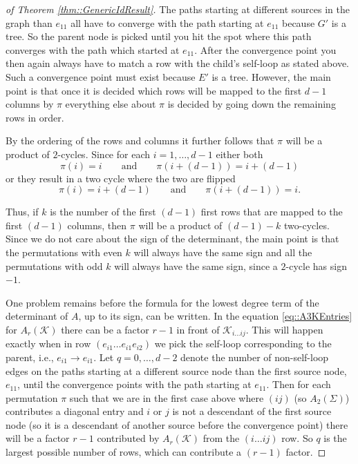 \documentclass{biometrika}
\begin{document}
\begin{proof}[of Theorem \ref{thm::GenericIdResult}]
The paths starting at different sources in the graph than $e_{11}$ all have to converge with the path starting at $e_{11}$ because $G'$ is a tree. So the parent node is picked until you hit the spot where this path converges with the path which started at $e_{11}$. After the convergence point you then again always have to match a row with the child's self-loop as stated above. Such a convergence point must exist because $E'$ is a tree. However, the main point is that once it is decided which rows will be mapped to the first $d-1$ columns by $\pi$ everything else about $\pi$ is decided by going down the remaining rows in order. 

By the ordering of the rows and columns it further follows that $\pi$ will be a product of $2$-cycles. Since for each $i = 1, \dots, d-1$ either both 
\begin{equation*}
    \pi(i) = i \qquad \mathrm{ and } \qquad \pi(i + (d-1)) = i + (d-1)
\end{equation*}
or they result in a two cycle where the two are flipped
\begin{equation*}
    \pi(i) = i + (d-1) \qquad \mathrm{ and } \qquad \pi(i + (d-1)) = i. 
\end{equation*}

Thus, if $k$ is the number of the first $(d-1)$ first rows that are mapped to the first $(d-1)$ columns, then $\pi$ will be a product of $(d-1) - k$ two-cycles. Since we do not care about the sign of the determinant, the main point is that the permutations with even $k$ will always have the same sign and all the permutations with odd $k$ will always have the same sign, since a $2$-cycle has sign $-1$. 

One problem remains before the formula for the lowest degree term of the determinant of $A$, up to its sign, can be written. In the equation \eqref{eq::A3KEntries} for $A_r(\mathcal{K} )$  there can be a factor $r-1$ in front of $\mathcal{K} _{i \dots ij}$. This will happen exactly when in row $(e_{i1} \dots e_{i1} e_{i2})$ we pick the self-loop corresponding to the parent, i.e., $e_{i1} \rightarrow e_{i1}$. 
Let $q = 0, \dots, d-2$ denote the number of non-self-loop edges on the paths starting at a different source node than the first source node, $e_{11}$, until the convergence points with the path starting at $e_{11}$.
Then for each permutation $\pi$ such that we are in the first case above where $(ij)$ (so $A_2(\Sigma)$) contributes a diagonal entry and $i$ or $j$ is not a descendant of the first source node (so it is a descendant of another source before the convergence point) there will be a factor $r-1$ contributed by $A_r(\mathcal{K} )$ from the $(i \dots ij)$ row. So $q$ is the largest possible number of rows, which can contribute a $(r-1)$ factor. 


\end{proof}
\end{document}
